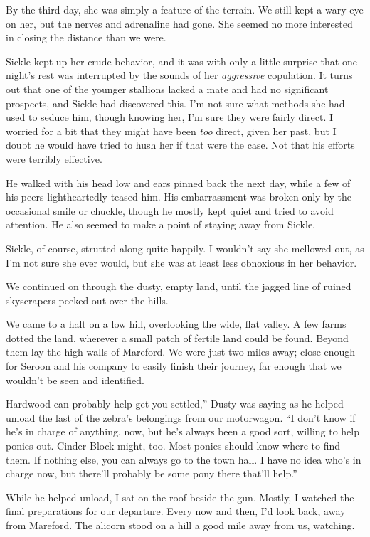 By the third day, she was simply a feature of the terrain. We still kept a wary eye on her, but the nerves and adrenaline had gone. She seemed no more interested in closing the distance than we were.

Sickle kept up her crude behavior, and it was with only a little surprise that one night’s rest was interrupted by the sounds of her \textit{aggressive} copulation. It turns out that one of the younger stallions lacked a mate and had no significant prospects, and Sickle had discovered this. I’m not sure what methods she had used to seduce him, though knowing her, I’m sure they were fairly direct. I worried for a bit that they might have been \textit{too} direct, given her past, but I doubt he would have tried to hush her if that were the case. Not that his efforts were terribly effective.

He walked with his head low and ears pinned back the next day, while a few of his peers lightheartedly teased him. His embarrassment was broken only by the occasional smile or chuckle, though he mostly kept quiet and tried to avoid attention. He also seemed to make a point of staying away from Sickle.

Sickle, of course, strutted along quite happily. I wouldn’t say she mellowed out, as I’m not sure she ever would, but she was at least less obnoxious in her behavior.

We continued on through the dusty, empty land, until the jagged line of ruined skyscrapers peeked out over the hills.

{\br}%
We came to a halt on a low hill, overlooking the wide, flat valley. A few farms dotted the land, wherever a small patch of fertile land could be found. Beyond them lay the high walls of Mareford. We were just two miles away; close enough for Seroon and his company to easily finish their journey, far enough that we wouldn’t be seen and identified.

\leavevmode{}Hardwood can probably help get you settled,” Dusty was saying as he helped unload the last of the zebra’s belongings from our motorwagon. “I don’t know if he’s in charge of anything, now, but he’s always been a good sort, willing to help ponies out. Cinder Block might, too. Most ponies should know where to find them. If nothing else, you can always go to the town hall. I have no idea who’s in charge now, but there’ll probably be some pony there that’ll help.”

While he helped unload, I sat on the roof beside the gun. Mostly, I watched the final preparations for our departure. Every now and then, I’d look back, away from Mareford. The alicorn stood on a hill a good mile away from us, watching.

